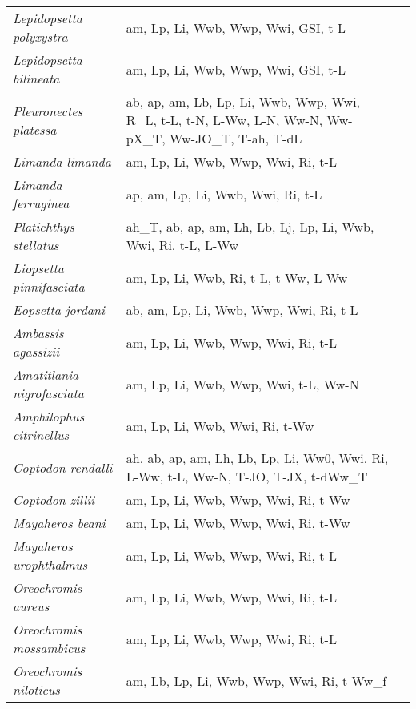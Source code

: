 {\begin{longtable}[c]{p{3.5cm}p{5.5cm}p{5.5cm}}
\emph{Lepidopsetta polyxystra} &  am, Lp, Li, Wwb, Wwp, Wwi, GSI, t-L & \citet{Forr1964,StarSome2002} \\
\emph{Lepidopsetta bilineata} &  am, Lp, Li, Wwb, Wwp, Wwi, GSI, t-L & \citet{Forr1964,StarSome2002} \\
\emph{Pleuronectes platessa} &  ab, ap, am, Lb, Lp, Li, Wwb, Wwp, Wwi, R\_L, t-L, t-N, L-Ww, L-N, Ww-N, Ww-pX\_T, Ww-JO\_T, T-ah, T-dL & \citet{SkjaFinn2003,RijnIbel1989,Whee1978,KennGeff2007,FondCron1992,Deni1981,Glaz1983,BollDick2009} \\
\emph{Limanda limanda} &  am, Lp, Li, Wwb, Wwp, Wwi, Ri, t-L & \citet{Magn2007} \\
\emph{Limanda ferruginea} &  ap, am, Lp, Li, Wwb, Wwi, Ri, t-L & \citet{DwyeWals2003} \\
\emph{Platichthys stellatus} &  ah\_T, ab, ap, am, Lh, Lb, Lj, Lp, Li, Wwb, Wwi, Ri, t-L, L-Ww &  \\
\emph{Liopsetta pinnifasciata} &  am, Lp, Li, Wwb, Ri, t-L, t-Ww, L-Ww & \citet{VdovChet2017} \\
\emph{Eopsetta jordani} &  ab, am, Lp, Li, Wwb, Wwp, Wwi, Ri, t-L & \citet{AldeForr1971,Krug1969} \\
\emph{Ambassis agassizii} &  am, Lp, Li, Wwb, Wwp, Wwi, Ri, t-L & \citet{MiltArth1985} \\
\emph{Amatitlania nigrofasciata} &  am, Lp, Li, Wwb, Wwp, Wwi, t-L, Ww-N & \citet{IshiTach2010} \\
\emph{Amphilophus citrinellus} &  am, Lp, Li, Wwb, Wwi, Ri, t-Ww & \citet{Oldf2009} \\
\emph{Coptodon rendalli} &  ah, ab, ap, am, Lh, Lb, Lp, Li, Ww0, Wwi, Ri, L-Ww, t-L, Ww-N, T-JO, T-JX, t-dWw\_T & \citet{PhilRuwe1982,ChanDeSi1981,WeylHech1998,Hlop2011,MoriMats2007,Caul1977,Caul1982,Kang2004} \\
\emph{Coptodon zillii} &  am, Lp, Li, Wwb, Wwp, Wwi, Ri, t-Ww & \citet{DikeAlev2002} \\
\emph{Mayaheros beani} &  am, Lp, Li, Wwb, Wwp, Wwi, Ri, t-Ww & \citet{GarcSoto2011,MartVald2014} \\
\emph{Mayaheros urophthalmus} &  am, Lp, Li, Wwb, Wwp, Wwi, Ri, t-L & \citet{FaunPatt2002} \\
\emph{Oreochromis aureus} &  am, Lp, Li, Wwb, Wwp, Wwi, Ri, t-L &  \\
\emph{Oreochromis mossambicus} &  am, Lp, Li, Wwb, Wwp, Wwi, Ri, t-L &  \\
\emph{Oreochromis niloticus} &  am, Lb, Lp, Li, Wwb, Wwp, Wwi, Ri, t-Ww\_f & \citet{BhujLitt2007} \\

\end{longtable}}

